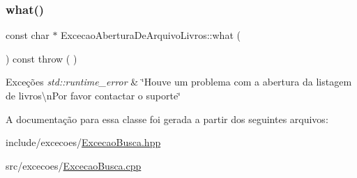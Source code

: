 \subsubsection{\texorpdfstring{what()}{what()}}
{\footnotesize\ttfamily const char $\ast$ Excecao\+Abertura\+De\+Arquivo\+Livros\+::what (\begin{DoxyParamCaption}{ }\end{DoxyParamCaption}) const throw ( ) \hspace{0.3cm}{\ttfamily [virtual]}}


\begin{DoxyExceptions}{Exceções}
{\em std\+::runtime\+\_\+error} & \char`\"{}\+Houve um problema com a abertura da listagem de livros\textbackslash{}n\+Por favor contactar o suporte\char`\"{} \\
\hline
\end{DoxyExceptions}


A documentação para essa classe foi gerada a partir dos seguintes arquivos\+:\begin{DoxyCompactItemize}
\item 
include/excecoes/\mbox{\hyperlink{_excecao_busca_8hpp}{Excecao\+Busca.\+hpp}}\item 
src/excecoes/\mbox{\hyperlink{_excecao_busca_8cpp}{Excecao\+Busca.\+cpp}}\end{DoxyCompactItemize}
